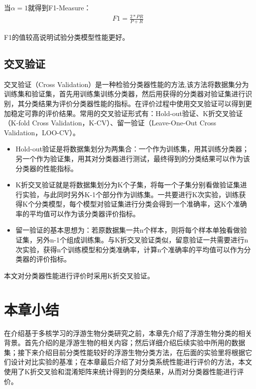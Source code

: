 当$\alpha=1$就得到F1-Measure：
\begin{eqnarray}
F1=\frac{2*PR}{P+R}
\end{eqnarray}

F1的值较高说明试验分类模型性能更好。

\subsection{交叉验证}

交叉验证（Cross Validation）是一种检验分类器性能的方法,该方法将数据集分为训练集和验证集，首先用训练集训练分类器，然后用获得的分类器对验证集进行识别，其分类结果为评价分类器性能的指标\cite{王怀亮2011交叉验证在数据建模模型选择中的应用}。在评价过程中使用交叉验证可以得到更加稳定可靠的评价结果。常用的交叉验证形式有：Hold-out验证、K折交叉验证（K-fold Cross Validation，K-CV）、留一验证（Leave-One-Out Cross Validation，LOO-CV）。
\begin{itemize}
\item Hold-out验证是将数据集划分为两集合：一个作为训练集，用其训练分类器；另一个作为验证集，用其对分类器进行测试，最终得到的分类结果可以作为该分类器的性能指标。
\item K折交叉验证就是将数据集划分为K个子集，将每一个子集分别看做验证集进行实验，与此同时另外K-1个部分作为训练集。一共要进行K次实验，训练获得K个分类模型，每个模型对验证集进行分类会得到一个准确率，这K个准确率的平均值可以作为该分类器评价指标。
\item 留一验证的基本思想为：若原数据集一共n个样本，则将每个样本单独看做验证集，另外n-1个组成训练集。与K折交叉验证类似，留意验证一共需要进行n次实验，获得n个训练模型和分类准确率，计算n个准确率的平均值可以作为分类器的评价指标。
\end{itemize}

本文对分类器性能进行评价时采用K折交叉验证。

\section{本章小结}

在介绍基于多核学习的浮游生物分类研究之前，本章先介绍了浮游生物分类的相关背景。首先介绍的是浮游生物的相关内容；然后详细介绍后续实验中所用的数据集；接下来介绍目前分类性能较好的浮游生物分类方法，在后面的实验里将根据它们设计对比实验的基准；在本章最后介绍了对分类系统性能进行评价的方法，本文使用了K折交叉验和混淆矩阵来统计得到的分类结果，从而对分类器性能进行评价。





